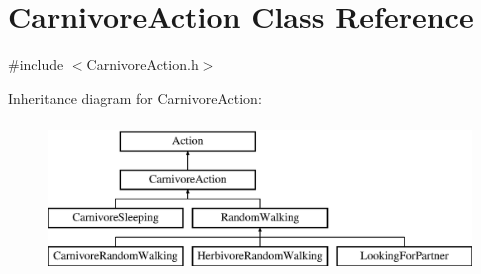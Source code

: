 \hypertarget{class_carnivore_action}{}\section{Carnivore\+Action Class Reference}
\label{class_carnivore_action}


{\ttfamily \#include $<$Carnivore\+Action.\+h$>$}

Inheritance diagram for Carnivore\+Action\+:\begin{figure}[H]
\begin{center}
\leavevmode
\includegraphics[height=4.000000cm]{class_carnivore_action}
\end{center}
\end{figure}
